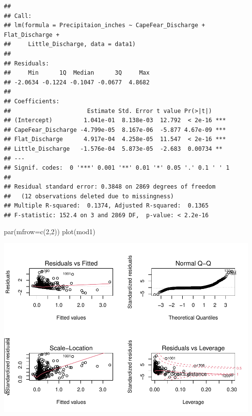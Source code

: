 \documentclass[
  12pt,
]{article}
\newenvironment{Shaded}{\begin{snugshade}}{\end{snugshade}}
\newcommand{\AttributeTok}[1]{\textcolor[rgb]{0.77,0.63,0.00}{#1}}
\newcommand{\DecValTok}[1]{\textcolor[rgb]{0.00,0.00,0.81}{#1}}
\newcommand{\FunctionTok}[1]{\textcolor[rgb]{0.00,0.00,0.00}{#1}}
\newcommand{\NormalTok}[1]{#1}
\begin{document}
\begin{verbatim}
## 
## Call:
## lm(formula = Precipitaion_inches ~ CapeFear_Discharge + Flat_Discharge + 
##     Little_Discharge, data = data1)
## 
## Residuals:
##     Min      1Q  Median      3Q     Max 
## -2.0634 -0.1224 -0.1047 -0.0677  4.8682 
## 
## Coefficients:
##                      Estimate Std. Error t value Pr(>|t|)    
## (Intercept)         1.041e-01  8.138e-03  12.792  < 2e-16 ***
## CapeFear_Discharge -4.799e-05  8.167e-06  -5.877 4.67e-09 ***
## Flat_Discharge      4.917e-04  4.258e-05  11.547  < 2e-16 ***
## Little_Discharge   -1.576e-04  5.873e-05  -2.683  0.00734 ** 
## ---
## Signif. codes:  0 '***' 0.001 '**' 0.01 '*' 0.05 '.' 0.1 ' ' 1
## 
## Residual standard error: 0.3848 on 2869 degrees of freedom
##   (12 observations deleted due to missingness)
## Multiple R-squared:  0.1374, Adjusted R-squared:  0.1365 
## F-statistic: 152.4 on 3 and 2869 DF,  p-value: < 2.2e-16
\end{verbatim}

\begin{Shaded}
\begin{Highlighting}[]
\FunctionTok{par}\NormalTok{(}\AttributeTok{mfrow=}\FunctionTok{c}\NormalTok{(}\DecValTok{2}\NormalTok{,}\DecValTok{2}\NormalTok{))}
\FunctionTok{plot}\NormalTok{(mod1)}
\end{Highlighting}
\end{Shaded}

\includegraphics{Project_files/figure-latex/river discharge and precipitation-1.pdf}
\end{document}
